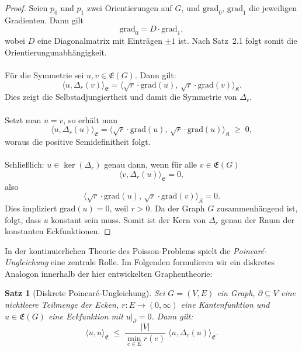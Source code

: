 \documentclass[11pt,a4paper,leqno]{report}
\newtheorem{proposition}{Satz}[chapter]
\numberwithin{equation}{chapter}
\begin{document}
\begin{proof}
	Seien $p_0$ und $p_1$ zwei Orientierungen auf $G$, 
	und $\mathrm{grad}_0$, $\mathrm{grad}_1$ die jeweiligen Gradienten. 
	Dann gilt
	\[
	\mathrm{grad}_0 = D \cdot \mathrm{grad}_1,
	\]
	wobei $D$ eine Diagonalmatrix mit Einträgen $\pm 1$ ist. 
	Nach Satz~2.1 folgt somit die Orientierungunabhängigkeit.\\
	\\
	Für die Symmetrie sei $u,v \in \mathfrak{E}(G)$. Dann gilt:
	\[
	\langle u, \Delta_r(v)\rangle_{\mathfrak{E}}
	= \langle \sqrt{r}\cdot \mathrm{grad}(u),\, \sqrt{r}\cdot \mathrm{grad}(v)\rangle_{\mathfrak{K}}.
	\]
	Dies zeigt die Selbstadjungiertheit und damit die Symmetrie von $\Delta_r$. \\
	\\
	Setzt man $u=v$, so erhält man
	\[
	\langle u, \Delta_r(u)\rangle_{\mathfrak{E}}
	= \langle \sqrt{r}\cdot \mathrm{grad}(u),\, \sqrt{r}\cdot \mathrm{grad}(u)\rangle_{\mathfrak{K}}
	\;\geq\;0,
	\]
	woraus die positive Semidefinitheit folgt.\\
	\\
	Schließlich: $u \in \ker(\Delta_r)$ genau dann, wenn für alle $v \in \mathfrak{E}(G)$
	\[
	\langle v, \Delta_r(u)\rangle_{\mathfrak{E}} = 0,
	\]
	also
	\[
	\langle \sqrt{r}\cdot \mathrm{grad}(u), \, \sqrt{r}\cdot \mathrm{grad}(v)\rangle_{\mathfrak{K}} = 0.
	\]
	Dies impliziert $\mathrm{grad}(u)=0$, weil $r>0$. Da der Graph $G$ zusammenhängend ist, folgt, 
	dass $u$ konstant sein muss. Somit ist der Kern von $\Delta_r$ genau der Raum der konstanten Eckfunktionen.
\end{proof}
\noindent
In der kontinuierlichen Theorie des Poisson-Problems spielt die 
\emph{Poincaré-Ungleichung} eine zentrale Rolle. 
Im Folgenden formulieren wir ein diskretes Analogon 
innerhalb der hier entwickelten Graphentheorie:
\begin{proposition}[Diskrete Poincaré-Ungleichung]
	Sei $G=(V,E)$ ein Graph, $\partial \subseteq V$ eine nichtleere Teilmenge 
	der Ecken, $r:E\to (0,\infty)$ eine Kantenfunktion und $u \in \mathfrak{E}(G)$ 
	eine Eckfunktion mit $u|_\partial = 0$. Dann gilt:
	\[
	\langle u, u \rangle_{\mathfrak{E}} 
	\;\leq\; \frac{|V|}{\min_{e\in E} r(e)} \;
	\langle u, \Delta_r(u) \rangle_{\mathfrak{E}} .
	\]
\end{proposition}
\end{document}
